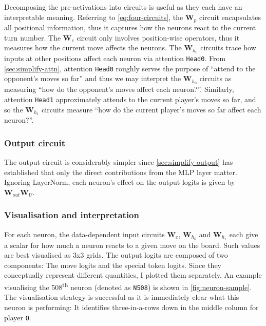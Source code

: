 \documentclass{article}
\newcommand{\m}[1]{\mathbf{\bm{#1}}}
\newcounter{num}
\begin{document}
Decomposing the pre-activations into circuits is useful as they each have an interpretable meaning. Referring to \cref{eq:four-circuits}, the $\m{W}_p$ circuit encapsulates all positional information, thus it captures how the neurons react to the current turn number. The $\m{W}_e$ circuit only involves position-wise operators, thus it measures how the current move affects the neurons. The $\m{W}_{h_0}$ circuits trace how inputs at other positions affect each neuron via attention \texttt{Head0}. From \cref{sec:simplify-attn}, attention \texttt{Head0} roughly serves the purpose of ``attend to the opponent's moves so far'' and thus we may interpret the $\m{W}_{h_0}$ circuits as measuring ``how do the opponent's moves affect each neuron?''. Similarly, attention \texttt{Head1} approximately attends to the current player's moves so far, and so the $\m{W}_{h_1}$ circuits measure ``how do the current player's moves so far affect each neuron?''.

\subsubsection{Output circuit}

The output circuit is considerably simpler since \cref{sec:simplify-output} has established that only the direct contributions from the MLP layer matter. Ignoring LayerNorm, each neuron's effect on the output logits is given by $\m{W}_{out} \m{W}_U$.

\subsubsection{Visualisation and interpretation}



For each neuron, the data-dependent input circuits $\m{W}_e$, $\m{W}_{h_0}$ and $\m{W}_{h_1}$ each give a scalar for how much a neuron reacts to a given move on the board. Such values are best visualised as 3x3 grids. The output logits are composed of two components: The move logits and the special token logits. Since they conceptually represent different quantities, I plotted them separately. An example visualising the 508\textsuperscript{th} neuron (denoted as \texttt{N508}) is shown in \cref{fig:neuron-sample}. The visualisation strategy is successful as it is immediately clear what this neuron is performing: It identifies three-in-a-rows down in the middle column for player \texttt{O}.


\end{document}
